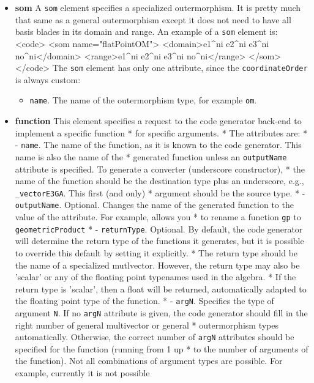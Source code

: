 \documentclass[10pt, a4paper]{article}
\begin{document}
\begin{itemize}
\item {\bf som} A {\tt som} element specifies a specialized outermorphism. It is pretty much that same as a general outermorphism
      except it does not need to have all basis blades in its domain and range. An example of a {\tt som} element is:
      <code>
      <som name="flatPointOM">
      <domain>e1^ni e2^ni e3^ni no^ni</domain>
      <range>e1^ni e2^ni e3^ni no^ni</range> 
      </som>
      </code>
      The {\tt som} element has only one attribute, since the {\tt coordinateOrder} is always custom:
       \begin{itemize}
       \item {\tt name}. The name of the outermorphism type, for example {\tt om}.
       \end{itemize}
\item {\bf function} This element specifies a request to the code generator back-end to implement a specific function
 *     for specific arguments.
 *     The attributes are:
 *        - {\tt name}. The name of the function, as it is known to the code generator. This name is also the name of the
 *           generated function unless an {\tt outputName} attribute is specified. To generate a converter (underscore constructor),
 *           the name of the function should be the destination type plus an underscore, e.g., {\tt _vectorE3GA}. This first (and only)
 *           argument should be the source type.
 *        - {\tt outputName}. Optional. Changes the name of the generated function to the value of the attribute. For example, allows you
 *          to rename a function {\tt gp} to {\tt geometricProduct}
 *        - {\tt returnType}. Optional. By default, the code generator will determine the return type of the functions it generates, but it is possible to override this default by setting it explicitly. 
 *          The return type should be the name of a specialized mutlvector. However, the return type may also be 'scalar' or any of the floating point typenames used in the algebra.
 *          If the return type is 'scalar', then a float will be returned, automatically adapted to the floating point type of the function.
 *        - {\tt argN}. Specifies the type of argument {\tt N}. If no {\tt argN} attribute is given, the code generator should fill in the right number of general multivector or general 
 *           outermorphism types automatically. Otherwise, the correct number of {\tt argN} attributes should be specified for the function (running from 1 up
 *           to the number of arguments of the function). Not all combinations of argument types are possible. For example, currently it is not possible

\end{itemize}
\end{document}
